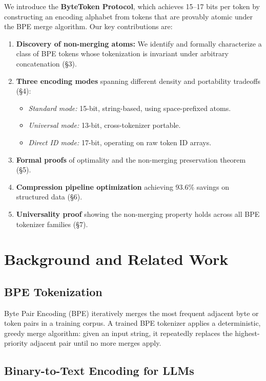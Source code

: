 \documentclass[10pt,twocolumn,letterpaper]{article}
\begin{document}
We introduce the \textbf{ByteToken Protocol}, which achieves 15--17 bits per token by constructing an encoding alphabet from tokens that are provably atomic under the BPE merge algorithm. Our key contributions are:

\begin{enumerate}
    \item \textbf{Discovery of non-merging atoms:} We identify and formally characterize a class of BPE tokens whose tokenization is invariant under arbitrary concatenation (\S 3).
    \item \textbf{Three encoding modes} spanning different density and portability tradeoffs (\S 4):
    \begin{itemize}
        \item \textit{Standard mode:} 15-bit, string-based, using space-prefixed atoms.
        \item \textit{Universal mode:} 13-bit, cross-tokenizer portable.
        \item \textit{Direct ID mode:} 17-bit, operating on raw token ID arrays.
    \end{itemize}
    \item \textbf{Formal proofs} of optimality and the non-merging preservation theorem (\S 5).
    \item \textbf{Compression pipeline optimization} achieving 93.6\% savings on structured data (\S 6).
    \item \textbf{Universality proof} showing the non-merging property holds across all BPE tokenizer families (\S 7).
\end{enumerate}

\section{Background and Related Work}

\subsection{BPE Tokenization}
Byte Pair Encoding (BPE) \cite{bpe} iteratively merges the most frequent adjacent byte or token pairs in a training corpus. A trained BPE tokenizer applies a deterministic, greedy merge algorithm: given an input string, it repeatedly replaces the highest-priority adjacent pair until no more merges apply.

\subsection{Binary-to-Text Encoding for LLMs}
\end{document}
